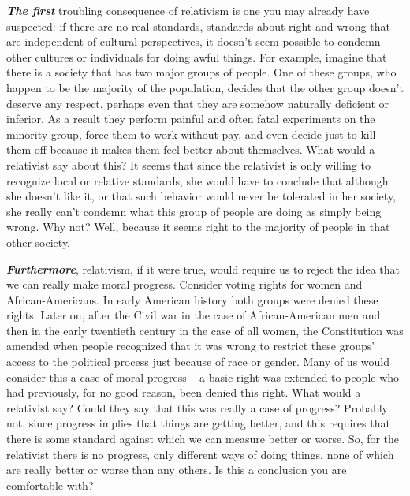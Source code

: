 \documentclass[]{book}
\begin{document}
\textbf{\emph{The first}} troubling consequence of relativism is one you may already have suspected: if there are no real standards, standards about right and wrong that are independent of cultural perspectives, it doesn't seem possible to condemn other cultures or individuals for doing awful things. For example, imagine that there is a society that has two major groups of people. One of these groups, who happen to be the majority of the population, decides that the other group doesn't deserve any respect, perhaps even that they are somehow naturally deficient or inferior. As a result they perform painful and often fatal experiments on the minority group, force them to work without pay, and even decide just to kill them off because it makes them feel better about themselves. What would a relativist say about this? It seems that since the relativist is only willing to recognize local or relative standards, she would have to conclude that although she doesn't like it, or that such behavior would never be tolerated in her society, she really can't condemn what this group of people are doing as simply being wrong. Why not? Well, because it seems right to the majority of people in that other society.

\textbf{\emph{Furthermore}}, relativism, if it were true, would require us to reject the idea that we can really make moral progress. Consider voting rights for women and African-Americans. In early American history both groups were denied these rights. Later on, after the Civil war in the case of African-American men and then in the early twentieth century in the case of all women, the Constitution was amended when people recognized that it was wrong to restrict these groups' access to the political process just because of race or gender. Many of us would consider this a case of moral progress -- a basic right was extended to people who had previously, for no good reason, been denied this right. What would a relativist say? Could they say that this was really a case of progress? Probably not, since progress implies that things are getting better, and this requires that there is some standard against which we can measure better or worse. So, for the relativist there is no progress, only different ways of doing things, none of which are really better or worse than any others. Is this a conclusion you are comfortable with?
\end{document}
